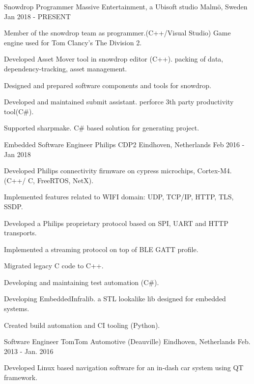 \begin{cventries}
  \cventry
    {Snowdrop Programmer}
    {Massive Entertainment, a Ubisoft studio}
    {Malmö, Sweden}
    {Jan 2018 - PRESENT}
    {
      \begin{cvitems}
		\item { Member of the snowdrop team as programmer.(C++/Visual Studio) Game engine used for Tom Clancy's The Division 2. }
        \item { Developed Asset Mover tool in snowdrop editor (C++). packing of data, dependency-tracking, asset management.}
		\item { Designed and prepared software components and tools for snowdrop. }
        \item { Developed and maintained submit assistant. perforce 3th party productivity tool(C\#). }
        \item { Supported sharpmake. C\# based solution for generating project. }
      \end{cvitems}
    }
  \cventry
    {Embedded Software Engineer}
    {Philips CDP2}
    {Eindhoven, Netherlands}
    {Feb 2016 - Jan 2018}
    {
      \begin{cvitems}
        \item {Developed Philips connectivity firmware on cypress microchips, Cortex-M4.(C++/ C, FreeRTOS, NetX).}
        \item {Implemented features related to WIFI domain: UDP, TCP/IP, HTTP, TLS, SSDP.}
        \item {Developed a Philips proprietary protocol based on SPI, UART and HTTP transports.}
        \item {Implemented a streaming protocol on top of BLE GATT profile.}
        \item {Migrated legacy C code to C++.}
        \item {Developing and maintaining test automation (C\#).}
        \item {Developing EmbeddedInfralib. a STL lookalike lib designed for embedded systems.}
        \item {Created build automation and CI tooling (Python).}
      \end{cvitems}
    }
  \cventry
    {Software Engineer}
    {TomTom Automotive (Deauville)}
    {Eindhoven, Netherlands}
    {Feb. 2013 - Jan. 2016}
    {
      \begin{cvitems}
        \item {Developed Linux based navigation software for an in-dash car system using QT framework.}

\end{cvitems}}
\end{cventries}
